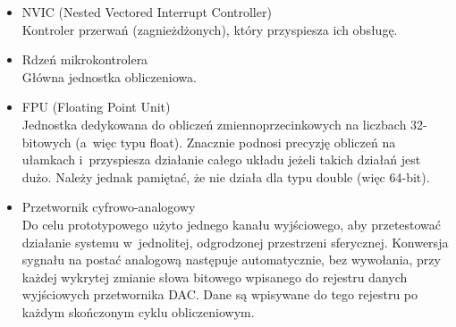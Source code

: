 \begin{enumerate}
\begin{itemize}
		\item NVIC (Nested Vectored Interrupt Controller)\\
		Kontroler przerwań (zagnieżdżonych), który przyspiesza ich obsługę.
		\item Rdzeń mikrokontrolera\\
		Główna jednostka obliczeniowa.
		\item FPU (Floating Point Unit)\\
		Jednostka dedykowana do obliczeń zmiennoprzecinkowych na liczbach 32-bitowych (a~więc typu float). Znacznie podnosi precyzję obliczeń na ułamkach i~przyspiesza działanie całego układu jeżeli takich działań jest dużo. Należy jednak pamiętać, że nie działa dla typu double (więc 64-bit). 
		\item Przetwornik cyfrowo-analogowy\\
		Do celu prototypowego użyto jednego kanału wyjściowego, aby przetestować działanie systemu w~jednolitej, odgrodzonej przestrzeni sferycznej. Konwersja sygnału na postać analogową następuje automatycznie, bez wywołania, przy każdej wykrytej zmianie słowa bitowego wpisanego do rejestru danych wyjściowych przetwornika DAC. Dane są wpisywane do tego rejestru po każdym skończonym cyklu obliczeniowym.
	\end{itemize}
\end{enumerate}

